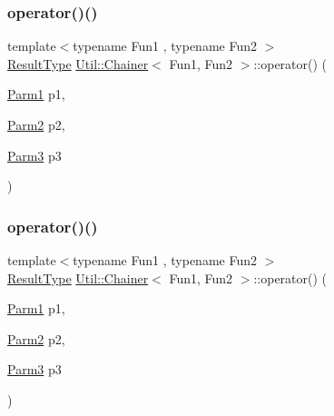 \mbox{\label{classUtil_1_1Chainer_af0f81081283f192626e5a83eb688f573}} 
\subsubsection{\texorpdfstring{operator()()}{operator()()}\hspace{0.1cm}{\footnotesize\ttfamily [7/12]}}
{\footnotesize\ttfamily template$<$typename Fun1 , typename Fun2 $>$ \\
\mbox{\hyperlink{classUtil_1_1Chainer_a2c8d88a77b8ba93eb915dc799ddafbb9}{Result\+Type}} \mbox{\hyperlink{classUtil_1_1Chainer}{Util\+::\+Chainer}}$<$ Fun1, Fun2 $>$\+::operator() (\begin{DoxyParamCaption}\item[{\mbox{\hyperlink{classUtil_1_1Chainer_a3e09b2267dabdd8d12070b09c47749c6}{Parm1}}}]{p1,  }\item[{\mbox{\hyperlink{classUtil_1_1Chainer_a1bfb0e8f35679278c85d232a74a107ff}{Parm2}}}]{p2,  }\item[{\mbox{\hyperlink{classUtil_1_1Chainer_ac28811d7153f7b7cf837f7b8626436c8}{Parm3}}}]{p3 }\end{DoxyParamCaption})\hspace{0.3cm}{\ttfamily [inline]}}

\mbox{\label{classUtil_1_1Chainer_af0f81081283f192626e5a83eb688f573}} 
\subsubsection{\texorpdfstring{operator()()}{operator()()}\hspace{0.1cm}{\footnotesize\ttfamily [8/12]}}
{\footnotesize\ttfamily template$<$typename Fun1 , typename Fun2 $>$ \\
\mbox{\hyperlink{classUtil_1_1Chainer_a2c8d88a77b8ba93eb915dc799ddafbb9}{Result\+Type}} \mbox{\hyperlink{classUtil_1_1Chainer}{Util\+::\+Chainer}}$<$ Fun1, Fun2 $>$\+::operator() (\begin{DoxyParamCaption}\item[{\mbox{\hyperlink{classUtil_1_1Chainer_a3e09b2267dabdd8d12070b09c47749c6}{Parm1}}}]{p1,  }\item[{\mbox{\hyperlink{classUtil_1_1Chainer_a1bfb0e8f35679278c85d232a74a107ff}{Parm2}}}]{p2,  }\item[{\mbox{\hyperlink{classUtil_1_1Chainer_ac28811d7153f7b7cf837f7b8626436c8}{Parm3}}}]{p3 }\end{DoxyParamCaption})\hspace{0.3cm}{\ttfamily [inline]}}

